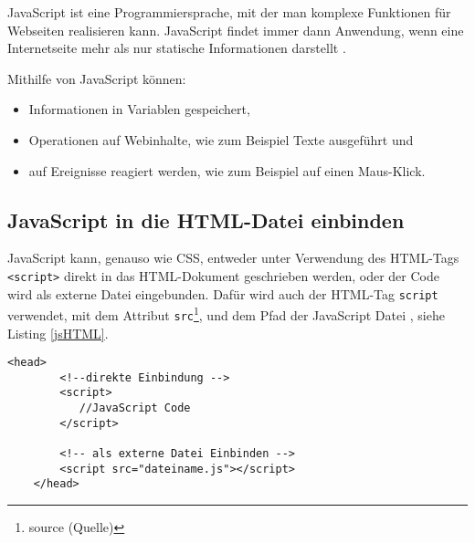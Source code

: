 JavaScript ist eine Programmiersprache, mit der man komplexe Funktionen für Webseiten realisieren kann. JavaScript findet immer dann Anwendung, wenn eine Internetseite mehr als nur statische Informationen darstellt \cite{Mozilla2021}. 

Mithilfe von JavaScript können: 
\begin{itemize}
    \item Informationen in Variablen gespeichert,
    \item Operationen auf Webinhalte, wie zum Beispiel Texte ausgeführt und 
    \item auf Ereignisse reagiert werden, wie zum Beispiel auf einen Maus-Klick.  
\end{itemize}

\subsection{JavaScript in die HTML-Datei einbinden}
JavaScript kann, genauso wie CSS, entweder unter Verwendung des HTML-Tags \texttt{<script>} direkt in das HTML-Dokument geschrieben werden, oder der Code wird als externe Datei eingebunden. Dafür wird auch der HTML-Tag \texttt{script} verwendet, mit dem Attribut \texttt{src}\footnote{source (Quelle)}, und dem Pfad der JavaScript Datei \cite{W3JS2021}, siehe Listing \ref{jsHTML}. 

\begin{lstlisting}[caption= JavaScript in HTML einbinden, label=jsHTML, float=!htb]
    <head>
        <!--direkte Einbindung -->
        <script>
           //JavaScript Code 
        </script>

        <!-- als externe Datei Einbinden -->
        <script src="dateiname.js"></script>
    </head>
\end{lstlisting}
